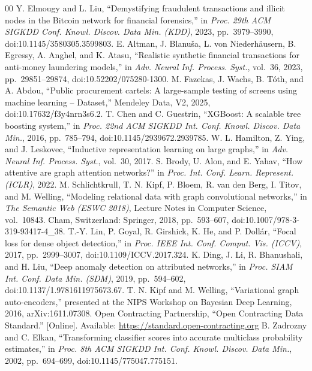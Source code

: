 \documentclass[conference]{IEEEtran}
\begin{document}
\begin{thebibliography}{00}
 Y. Elmougy and L. Liu, ``Demystifying fraudulent transactions and illicit nodes in the Bitcoin network for financial forensics,'' in \emph{Proc. 29th ACM SIGKDD Conf. Knowl. Discov. Data Min. (KDD)}, 2023, pp.~3979--3990, doi:10.1145/3580305.3599803.
 E. Altman, J. Blanu\v{s}a, L. von Niederh\"ausern, B. Egressy, A. Anghel, and K. Atasu, ``Realistic synthetic financial transactions for anti-money laundering models,'' in \emph{Adv. Neural Inf. Process. Syst.}, vol.~36, 2023, pp.~29851--29874, doi:10.52202/075280-1300.
 M. Fazekas, J. Wachs, B. T\'oth, and A. Abdou, ``Public procurement cartels: A large-sample testing of screens using machine learning -- Dataset,'' Mendeley Data, V2, 2025, doi:10.17632/f3y4nrn3s6.2.
 T. Chen and C. Guestrin, ``XGBoost: A scalable tree boosting system,'' in \emph{Proc. 22nd ACM SIGKDD Int. Conf. Knowl. Discov. Data Min.}, 2016, pp.~785--794, doi:10.1145/2939672.2939785.
 W. L. Hamilton, Z. Ying, and J. Leskovec, ``Inductive representation learning on large graphs,'' in \emph{Adv. Neural Inf. Process. Syst.}, vol.~30, 2017.
 S. Brody, U. Alon, and E. Yahav, ``How attentive are graph attention networks?'' in \emph{Proc. Int. Conf. Learn. Represent. (ICLR)}, 2022.
 M. Schlichtkrull, T. N. Kipf, P. Bloem, R. van den Berg, I. Titov, and M. Welling, ``Modeling relational data with graph convolutional networks,'' in \emph{The Semantic Web (ESWC 2018)}, Lecture Notes in Computer Science, vol.~10843. Cham, Switzerland: Springer, 2018, pp.~593--607, doi:10.1007/978-3-319-93417-4\_38.
 T.-Y. Lin, P. Goyal, R. Girshick, K. He, and P. Doll\'ar, ``Focal loss for dense object detection,'' in \emph{Proc. IEEE Int. Conf. Comput. Vis. (ICCV)}, 2017, pp.~2999--3007, doi:10.1109/ICCV.2017.324.
 K. Ding, J. Li, R. Bhanushali, and H. Liu, ``Deep anomaly detection on attributed networks,'' in \emph{Proc. SIAM Int. Conf. Data Min. (SDM)}, 2019, pp.~594--602, doi:10.1137/1.9781611975673.67.
 T. N. Kipf and M. Welling, ``Variational graph auto-encoders,'' presented at the NIPS Workshop on Bayesian Deep Learning, 2016, arXiv:1611.07308.
 Open Contracting Partnership, ``Open Contracting Data Standard.'' [Online]. Available: \url{https://standard.open-contracting.org}
 B. Zadrozny and C. Elkan, ``Transforming classifier scores into accurate multiclass probability estimates,'' in \emph{Proc. 8th ACM SIGKDD Int. Conf. Knowl. Discov. Data Min.}, 2002, pp.~694--699, doi:10.1145/775047.775151.

\end{thebibliography}
\end{document}
